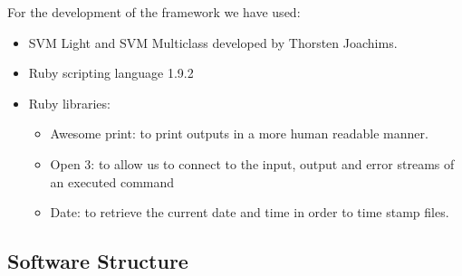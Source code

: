 \documentclass[a4paper,10pt,titlepage]{article}
\begin{document}
For the development of the framework we have used:
\begin{itemize}
	\item SVM Light and SVM Multiclass developed by Thorsten Joachims.
	\item Ruby scripting language 1.9.2
	\item Ruby libraries:
	\begin{itemize}
		\item Awesome print: to print outputs in a more human readable manner.
		\item Open 3: to allow us to connect to the input, output and error streams of an executed command
		\item Date: to retrieve the current date and time in order to time stamp files. 
	\end{itemize}
\end{itemize}

\subsection{Software Structure}
\end{document}
